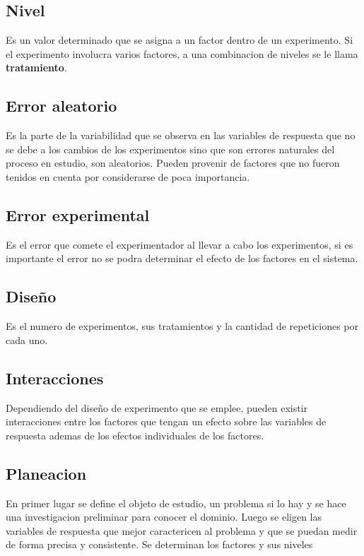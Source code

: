 \documentclass[a4paper]{article}
\begin{document}
\subsection*{Nivel}
Es un valor determinado que se asigna a un factor dentro de un experimento. Si el experimento involucra varios factores,
a una combinacion de niveles se le llama \textbf{tratamiento}.

\subsection*{Error aleatorio}
Es la parte de la variabilidad que se observa en las variables de respuesta que no se debe a los cambios de los 
experimentos sino que son errores naturales del proceso en estudio, son aleatorios. Pueden provenir de factores
que no fueron tenidos en cuenta por considerarse de poca importancia.

\subsection*{Error experimental}
Es el error que comete el experimentador al llevar a cabo los experimentos, si es importante el error no se podra
determinar el efecto de los factores en el sistema.

\subsection*{Diseño}
Es el numero de experimentos, sus tratamientos y la cantidad de repeticiones por cada uno.

\subsection*{Interacciones}
Dependiendo del diseño de experimento que se emplee, pueden existir interacciones entre los factores que tengan 
un efecto sobre las variables de respuesta ademas de los efectos individuales de los factores.

\subsection*{Planeacion}
En primer lugar se define el objeto de estudio, un problema si lo hay y se hace una investigacion preliminar para
conocer el dominio.
Luego se eligen las variables de respuesta que mejor caractericen al problema y que se puedan medir de forma
precisa y consistente.
Se determinan los factores y sus niveles
\end{document}

